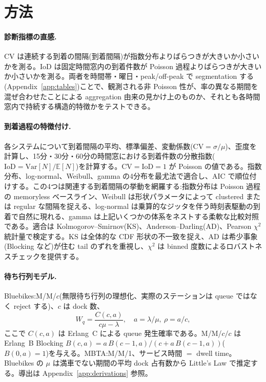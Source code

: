 \section{方法}\label{sec:methods}

\paragraph{診断指標の直感.} CV は連続する到着の間隔(到着間隔)が指数分布よりばらつきが大きいか小さいかを測る。IoD は固定時間窓内の到着件数が Poisson 過程よりばらつきが大きいか小さいかを測る。両者を時間帯・曜日・peak/off-peak で segmentation する(Appendix~\ref{app:tables})ことで、観測される非 Poisson 性が、率の異なる期間を混ぜ合わせたことによる aggregation 由来の見かけ上のものか、それとも各時間窓内で持続する構造的特徴かをテストできる。

\paragraph{到着過程の特徴付け.} 各システムについて到着間隔の平均、標準偏差、変動係数($\mathrm{CV} = \sigma/\mu$)、歪度を計算し、15分・30分・60分の時間窓における到着件数の分散指数($\mathrm{IoD} = \mathrm{Var}[N]/\mathbb{E}[N]$)を計算する。$\mathrm{CV} = \mathrm{IoD} = 1$ が Poisson の値である。指数分布、log-normal、Weibull、gamma の4分布を最尤法で適合し、AIC で順位付けする。この4つは関連する到着間隔の挙動を網羅する:指数分布は Poisson 過程の memoryless ベースライン、Weibull は形状パラメータによって clustered または regular な間隔を捉える、log-normal は乗算的なジッタを伴う時刻表駆動の到着で自然に現れる、gamma は上記いくつかの体系をネストする柔軟な比較対照である。適合は Kolmogorov--Smirnov(KS)、Anderson--Darling(AD)、Pearson $\chi^2$ 統計量で検定する。KS は全体的な CDF 形状の不一致を捉え、AD は希少事象(Blocking など)が住む tail のずれを重視し、$\chi^2$ は binned 度数によるロバストネスチェックを提供する。

\paragraph{待ち行列モデル.} Bluebikes:M/M/$c$(無限待ち行列の理想化、実際のステーションは queue ではなく reject する)、$c$ は dock 数、
\begin{equation}
W_q = \frac{C(c, a)}{c\mu - \lambda}, \quad a = \lambda/\mu,\ \rho = a/c,
\label{eq:mmc}
\end{equation}
ここで $C(c,a)$ は Erlang~C による queue 発生確率である。M/M/$c/c$ は Erlang~B Blocking $B(c,a) = a\,B(c-1,a) / (c + a\,B(c-1,a))$($B(0,a) = 1$)を与える。MBTA:M/M/1、サービス時間 $=$ dwell time。Bluebikes の $\mu$ は満車でない期間の平均 dock 占有数から Little's Law \cite{little1961} で推定する。導出は Appendix~\ref{app:derivations} 参照。

